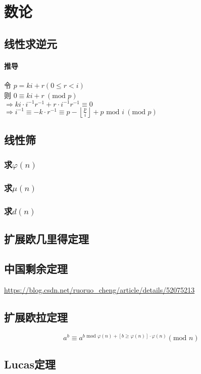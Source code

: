 \documentclass{article}
\begin{document}
	\section{数论}
		\subsection{线性求逆元}
			\paragraph{推导}
			令 $p = ki + r (0 \le r < i)$ \\
			则 $0 \equiv ki + r \: (\text{mod } p)$ \\
			$\Rightarrow ki \cdot i^{-1} r^{-1} + r \cdot i^{-1} r^{-1} \equiv 0$ \\
			$\Rightarrow i^{-1} \equiv -k \cdot r^{-1} \equiv p - \left\lfloor \frac{p}{i}\right\rfloor + p \text{ mod } i \: ( \text{mod } p )$
			
			
		\subsection{线性筛}
			\subsubsection{求$\varphi(n)$}
			
			\subsubsection{求$\mu(n)$}
			
			\subsubsection{求$d(n)$}
			
		\subsection{扩展欧几里得定理}
		
		\subsection{中国剩余定理}
		\url{https://blog.csdn.net/ruoruo_cheng/article/details/52075213}
		
		\subsection{扩展欧拉定理}
		$$
		a^b \equiv a^{b \text{ mod } \varphi(n) + [b \ge \varphi(n)] \cdot \varphi(n)} (\text{mod } n)
		$$
		
		\subsection{Lucas定理}
		
\end{document}

